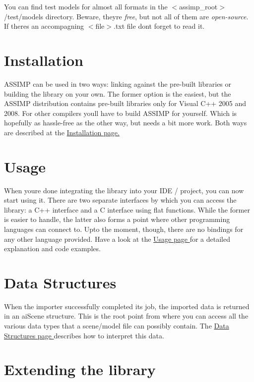 You can find test models for almost all formats in the $<$assimp\+\_\+root$>$/test/models directory. Beware, they\textquotesingle{}re {\itshape free}, but not all of them are {\itshape open-\/source}. If there\textquotesingle{}s an accompagning \textquotesingle{}$<$file$>$.txt\textquotesingle{} file don\textquotesingle{}t forget to read it.\hypertarget{index_main_install}{}\section{Installation}\label{index_main_install}
A\+S\+S\+I\+M\+P can be used in two ways\+: linking against the pre-\/built libraries or building the library on your own. The former option is the easiest, but the A\+S\+S\+I\+M\+P distribution contains pre-\/built libraries only for Visual C++ 2005 and 2008. For other compilers you\textquotesingle{}ll have to build A\+S\+S\+I\+M\+P for yourself. Which is hopefully as hassle-\/free as the other way, but needs a bit more work. Both ways are described at the \hyperlink{install}{Installation page. }\hypertarget{index_main_usage}{}\section{Usage}\label{index_main_usage}
When you\textquotesingle{}re done integrating the library into your I\+D\+E / project, you can now start using it. There are two separate interfaces by which you can access the library\+: a C++ interface and a C interface using flat functions. While the former is easier to handle, the latter also forms a point where other programming languages can connect to. Upto the moment, though, there are no bindings for any other language provided. Have a look at the \hyperlink{usage}{Usage page } for a detailed explanation and code examples.\hypertarget{index_main_data}{}\section{Data Structures}\label{index_main_data}
When the importer successfully completed its job, the imported data is returned in an ai\+Scene structure. This is the root point from where you can access all the various data types that a scene/model file can possibly contain. The \hyperlink{data}{Data Structures page } describes how to interpret this data.\hypertarget{index_ext}{}\section{Extending the library}\label{index_ext}

